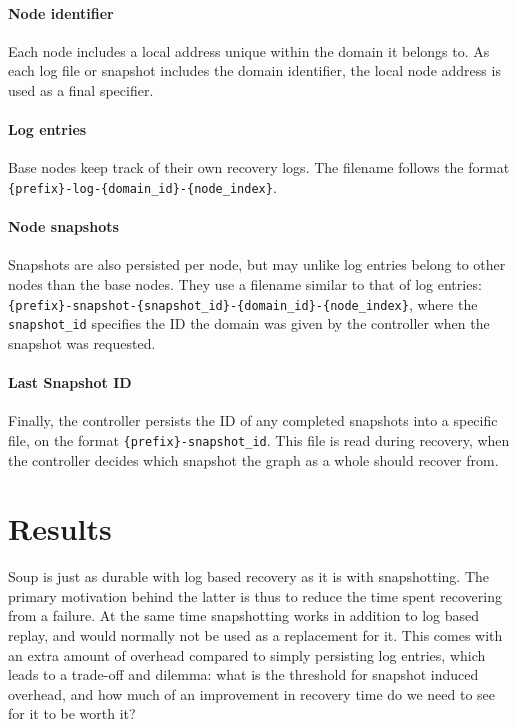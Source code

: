 \documentclass[b5paper]{report}
\begin{document}
\subsubsection{Node identifier}
Each node includes a local address unique within the domain it belongs to. As
each log file or snapshot includes the domain identifier, the local node address
is used as a final specifier.

\subsubsection{Log entries}
Base nodes keep track of their own recovery logs. The filename follows the
format \texttt{\{prefix\}-log-\{domain\_id\}-\{node\_index\}}.

\subsubsection{Node snapshots}
Snapshots are also persisted per node, but may unlike log entries belong to
other nodes than the base nodes. They use a filename similar to that of log
entries:
\texttt{\{prefix\}-snapshot-\{snapshot\_id\}-\{domain\_id\}-\{node\_index\}},
where the \texttt{snapshot\_id} specifies the ID the domain was given by the
controller when the snapshot was requested.

\subsubsection{Last Snapshot ID}
Finally, the controller persists the ID of any completed snapshots into a
specific file, on the format \texttt{\{prefix\}-snapshot\_id}. This file is read
during recovery, when the controller decides which snapshot the graph as a whole
should recover from.

\chapter{Results} \label{chap:results}
Soup is just as durable with log based recovery as it is with snapshotting. The
primary motivation behind the latter is thus to reduce the time spent recovering
from a failure. At the same time snapshotting works in addition to log based
replay, and would normally not be used as a replacement for it. This comes with
an extra amount of overhead compared to simply persisting log entries, which
leads to a trade-off and dilemma: what is the threshold for snapshot induced
overhead, and how much of an improvement in recovery time do we need to see for
it to be worth it?
\end{document}

